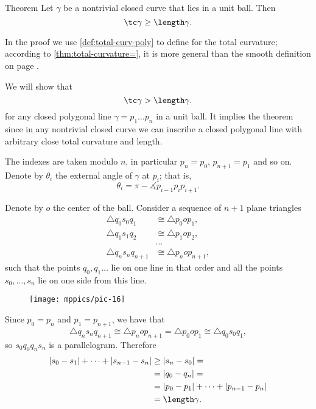 \begin{thm}{Theorem}\label{thm:DNA}
Let $\gamma$ be a nontrivial closed curve that lies in a unit ball.
Then 
\[\tc\gamma\ge \length\gamma.\]

\end{thm}

In the proof we use \ref{def:total-curv-poly} to define for the total curvature;
according to \ref{thm:total-curvature=}, it is more general than the smooth definition on page \pageref{page:total curvature of:smooth-def}.

We will show that 
\[\tc\gamma> \length\gamma.\]
for any closed polygonal line $\gamma=p_1\dots p_{n}$ in a unit ball.
It implies the theorem since in any nontrivial closed curve we can inscribe a closed polygonal line with arbitrary close total curvature and length.

The indexes are taken modulo $n$, in particular $p_{n}=p_0$, $p_{n+1}=p_1$ and so on.
Denote by $\theta_i$ the external angle of $\gamma$ at $p_i$;
that is,
\[\theta_i=\pi-\measuredangle p_{i-1}p_ip_{i+1}.\]

Denote by $o$ the center of the ball.
Consider a sequence of $n+1$ plane triangles
\begin{align*}
\triangle q_0s_0q_1
&\cong 
\triangle p_0op_1,
\\
\triangle q_1s_1q_2
&\cong 
\triangle p_1op_2,
\\
&\dots
\\
\triangle q_{n}s_nq_{n+1}
&\cong 
\triangle p_nop_{n+1},
\end{align*}
such that the points $q_0,q_1\dots$ lie on one line in that order and all the points $s_0,\dots,s_n$ lie on one side from this line.

\begin{figure}[h!]
\vskip-0mm
\centering
\texttt{[image: mppics/pic-16]}
\vskip0mm
\end{figure}

Since $p_0=p_n$ and $p_1=p_{n+1}$, we have that
\[\triangle q_{n}s_nq_{n+1}\cong 
\triangle p_nop_{n+1}=\triangle p_0op_1\cong\triangle q_{0}s_0q_1,\]
so $s_0q_0q_ns_n$ is a parallelogram.
Therefore
\begin{align*}
|s_0-s_1|+\dots+|s_{n-1}-s_n|
&\ge|s_n-s_0|=
\\
&=|q_0-q_n|=
\\
&=|p_0-p_1|+\dots+|p_{n-1}-p_n|
\\
&=\length \gamma.
\end{align*}

